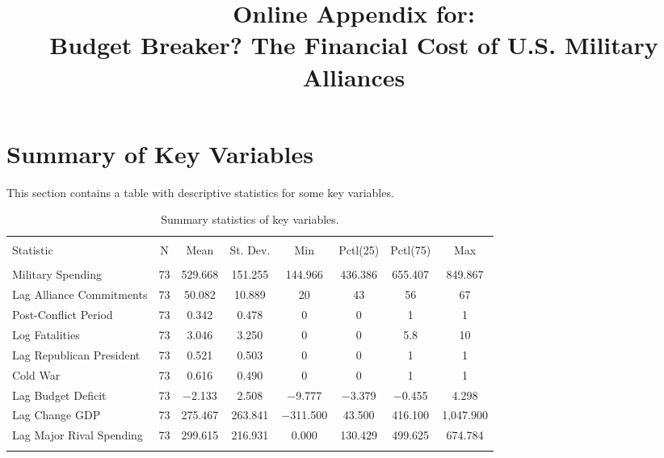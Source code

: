 \documentclass[12pt]{article}
\title{\textbf{Online Appendix for: \\
\large Budget Breaker? The Financial Cost of U.S. Military Alliances}}
\author{}
\date{}
\begin{document}
\maketitle 

\doublespace 

\tableofcontents

\clearpage

\section{Summary of Key Variables} 

This section contains a table with descriptive statistics for some key variables.  


\begin{table}[!htbp] \centering 
\begin{adjustbox}{width= .95\textwidth, center}
\begin{tabular}{@{\extracolsep{5pt}}lccccccc} 
\\[-1.8ex]\hline 
\hline \\[-1.8ex] 
Statistic & \multicolumn{1}{c}{N} & \multicolumn{1}{c}{Mean} & \multicolumn{1}{c}{St. Dev.} & \multicolumn{1}{c}{Min} & \multicolumn{1}{c}{Pctl(25)} & \multicolumn{1}{c}{Pctl(75)} & \multicolumn{1}{c}{Max} \\ 
\hline \\[-1.8ex] 
Military Spending & 73 & 529.668 & 151.255 & 144.966 & 436.386 & 655.407 & 849.867 \\ 
Lag Alliance Commitments & 73 & 50.082 & 10.889 & 20 & 43 & 56 & 67 \\ 
Post-Conflict Period & 73 & 0.342 & 0.478 & 0 & 0 & 1 & 1 \\ 
Log Fatalities & 73 & 3.046 & 3.250 & 0 & 0 & 5.8 & 10 \\ 
Lag Republican President & 73 & 0.521 & 0.503 & 0 & 0 & 1 & 1 \\ 
Cold War & 73 & 0.616 & 0.490 & 0 & 0 & 1 & 1 \\ 
Lag Budget Deficit & 73 & $-$2.133 & 2.508 & $-$9.777 & $-$3.379 & $-$0.455 & 4.298 \\ 
Lag Change GDP & 73 & 275.467 & 263.841 & $-$311.500 & 43.500 & 416.100 & 1,047.900 \\ 
Lag Major Rival Spending & 73 & 299.615 & 216.931 & 0.000 & 130.429 & 499.625 & 674.784 \\ 
\hline \\[-1.8ex] 
\end{tabular} 
\end{adjustbox}
   \caption{Summary statistics of key variables.} 
  \label{tab:summary-stat} 
\end{table} 
\end{document}
